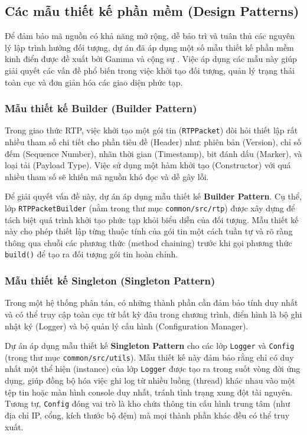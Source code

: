 \subsection{Các mẫu thiết kế phần mềm (Design Patterns)}

Để đảm bảo mã nguồn có khả năng mở rộng, dễ bảo trì và tuân thủ các nguyên lý lập trình hướng đối tượng, dự án đã áp dụng một số mẫu thiết kế phần mềm kinh điển được đề xuất bởi Gamma và cộng sự \cite{gamma1994design}. Việc áp dụng các mẫu này giúp giải quyết các vấn đề phổ biến trong việc khởi tạo đối tượng, quản lý trạng thái toàn cục và đơn giản hóa các giao diện phức tạp.

\subsubsection{Mẫu thiết kế Builder (Builder Pattern)}
Trong giao thức RTP, việc khởi tạo một gói tin (\texttt{RTPPacket}) đòi hỏi thiết lập rất nhiều tham số chi tiết cho phần tiêu đề (Header) như: phiên bản (Version), chỉ số đếm (Sequence Number), nhãn thời gian (Timestamp), bit đánh dấu (Marker), và loại tải (Payload Type). Việc sử dụng một hàm khởi tạo (Constructor) với quá nhiều tham số sẽ khiến mã nguồn khó đọc và dễ gây lỗi.

Để giải quyết vấn đề này, dự án áp dụng mẫu thiết kế \textbf{Builder Pattern}. Cụ thể, lớp \texttt{RTPPacketBuilder} (nằm trong thư mục \texttt{common/src/rtp}) được xây dựng để tách biệt quá trình khởi tạo phức tạp khỏi biểu diễn của đối tượng. Mẫu thiết kế này cho phép thiết lập từng thuộc tính của gói tin một cách tuần tự và rõ ràng thông qua chuỗi các phương thức (method chaining) trước khi gọi phương thức \texttt{build()} để tạo ra đối tượng gói tin hoàn chỉnh.

\subsubsection{Mẫu thiết kế Singleton (Singleton Pattern)}
Trong một hệ thống phân tán, có những thành phần cần đảm bảo tính duy nhất và có thể truy cập toàn cục từ bất kỳ đâu trong chương trình, điển hình là bộ ghi nhật ký (Logger) và bộ quản lý cấu hình (Configuration Manager).

Dự án áp dụng mẫu thiết kế \textbf{Singleton Pattern} cho các lớp \texttt{Logger} và \texttt{Config} (trong thư mục \texttt{common/src/utils}). Mẫu thiết kế này đảm bảo rằng chỉ có duy nhất một thể hiện (instance) của lớp \texttt{Logger} được tạo ra trong suốt vòng đời ứng dụng, giúp đồng bộ hóa việc ghi log từ nhiều luồng (thread) khác nhau vào một tệp tin hoặc màn hình console duy nhất, tránh tình trạng xung đột tài nguyên. Tương tự, \texttt{Config} đóng vai trò là kho chứa thông tin cấu hình trung tâm (như địa chỉ IP, cổng, kích thước bộ đệm) mà mọi thành phần khác đều có thể truy xuất.

